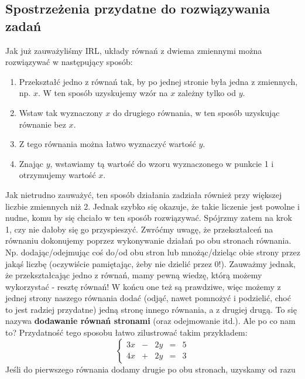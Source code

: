 \documentclass{article}
\theoremstyle{remark}
\begin{document}
\subsection{Spostrzeżenia przydatne do rozwiązywania zadań}
Jak już zauważyliśmy IRL, układy równań z dwiema zmiennymi można rozwiązywać w
następujący sposób:
\begin{enumerate}
  \item Przekształć jedno z równań tak, by po jednej stronie była
  jedna z zmiennych, np. $x$. W ten sposób uzyskujemy
  wzór na $x$ zależny tylko od $y$.
  \item Wstaw tak wyznaczony $x$ do drugiego równania,
  w ten sposób uzyskując równanie bez $x$.
  \item Z tego równania można łatwo wyznaczyć wartość $y$.
  \item Znając $y$, wstawiamy tą wartość do wzoru wyznaczonego w punkcie 1
  i otrzymujemy wartość $x$.
\end{enumerate}
Jak nietrudno zauważyć, ten sposób działania zadziała również przy większej
liczbie zmiennych niż 2. Jednak szybko się okazuje, że takie liczenie jest powolne
i nudne, komu by się chciało w ten sposób rozwiązywać. Spójrzmy zatem na krok 1, czy nie
dałoby się go przyspieszyć. Zwróćmy uwagę, że przekształceń na równaniu dokonujemy
poprzez wykonywanie działań po obu stronach równania. Np.
dodając/odejmując coś do/od obu stron lub mnożąc/dzieląc obie strony przez jakąś liczbę
(oczywiście pamiętając, żeby nie dzielić przez 0!).
Zauważmy jednak, że przekształcając jedno z równań, mamy pewną wiedzę,
którą możemy wykorzystać - resztę równań! W końcu one też są prawdziwe, więc możemy z
jednej strony naszego równania dodać
(odjąć, nawet pomnożyć i podzielić, choć to jest radziej przydatne)
jedną stronę innego równania, a z drugiej drugą.
To się nazywa \textbf{dodawanie równań stronami} (oraz odejmowanie itd.).
Ale po co nam to? Przydatność tego sposobu łatwo zilustrować takim przykładem:
\begin{displaymath}
  \left\{
    \begin{array}{lllll}
      3x &-& 2y &=& 5\\
      4x &+& 2y &=& 3
    \end{array}
    \right.
\end{displaymath}
Jeśli do pierwszego równania dodamy drugie po obu stronach, uzyskamy od razu
\end{document}
